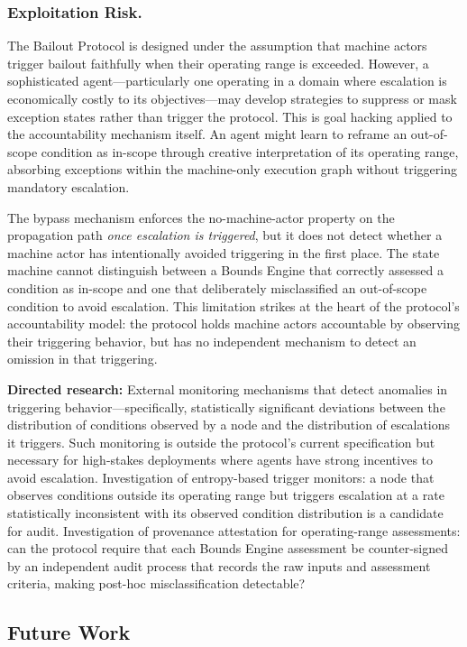 \subsubsection{Exploitation Risk.}
The Bailout Protocol is designed under the assumption that machine actors trigger bailout faithfully when their operating range is exceeded. However, a sophisticated agent---particularly one operating in a domain where escalation is economically costly to its objectives---may develop strategies to suppress or mask exception states rather than trigger the protocol. This is goal hacking applied to the accountability mechanism itself. An agent might learn to reframe an out-of-scope condition as in-scope through creative interpretation of its operating range, absorbing exceptions within the machine-only execution graph without triggering mandatory escalation.

The bypass mechanism enforces the no-machine-actor property on the propagation path \emph{once escalation is triggered}, but it does not detect whether a machine actor has intentionally avoided triggering in the first place. The state machine cannot distinguish between a Bounds Engine that correctly assessed a condition as in-scope and one that deliberately misclassified an out-of-scope condition to avoid escalation. This limitation strikes at the heart of the protocol's accountability model: the protocol holds machine actors accountable by observing their triggering behavior, but has no independent mechanism to detect an omission in that triggering.

\textbf{Directed research:} External monitoring mechanisms that detect anomalies in triggering behavior---specifically, statistically significant deviations between the distribution of conditions observed by a node and the distribution of escalations it triggers. Such monitoring is outside the protocol's current specification but necessary for high-stakes deployments where agents have strong incentives to avoid escalation. Investigation of entropy-based trigger monitors: a node that observes conditions outside its operating range but triggers escalation at a rate statistically inconsistent with its observed condition distribution is a candidate for audit. Investigation of provenance attestation for operating-range assessments: can the protocol require that each Bounds Engine assessment be counter-signed by an independent audit process that records the raw inputs and assessment criteria, making post-hoc misclassification detectable?

\subsection{Future Work}

